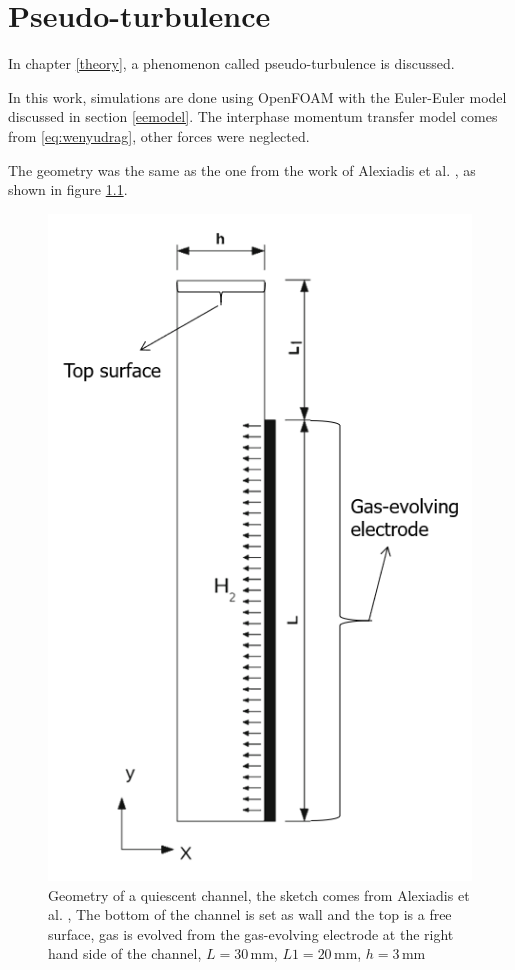 \chapter{Pseudo-turbulence}\label{appendixa}

In chapter \ref{theory}, a phenomenon called pseudo-turbulence is discussed. 

In this work, simulations are done using OpenFOAM with the Euler-Euler model discussed in section \ref{eemodel}. The interphase momentum transfer model comes from \ref{eq:wenyudrag}, other forces were neglected.

The geometry was the same as the one from the work of Alexiadis et al. \cite{Alexiadis2012}, as shown in figure \ref{appendixgeometry1}.

\begin{figure}[H]
    \centering
    \includegraphics[scale = 0.7]{appendixgeometry1.png}
    \caption{Geometry of a quiescent channel, the sketch comes from Alexiadis et al. \cite{Alexiadis2012}, The bottom of the channel is set as wall and the top is a free surface, gas is evolved from the gas-evolving electrode at the right hand side of the channel, $L = 30 \, \mathrm{mm}$, $L1 = 20 \, \mathrm{mm}$, $h = 3 \, \mathrm{mm}$}
    \label{appendixgeometry1}
\end{figure}

